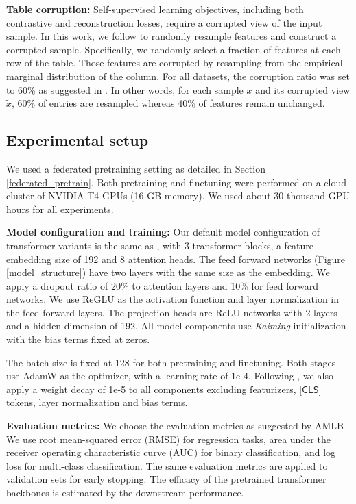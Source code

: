 \textbf{Table corruption:} Self-supervised learning objectives, including both contrastive and reconstruction losses, require a corrupted view of the input sample. In this work, we follow \citet{bahri2021scarf, rubachev2022revisiting} to randomly resample features and construct a corrupted sample. Specifically, we randomly select a fraction of features at each row of the table. Those features are corrupted by resampling from the empirical marginal distribution of the column. For all datasets, the corruption ratio was set to 60\% as suggested in \citet{bahri2021scarf}. In other words, for each sample $x$ and its corrupted view $\tilde{x}$, 60\% of entries are resampled whereas 40\% of features remain unchanged. 

\subsection{Experimental setup} We used a federated pretraining setting as detailed in Section \ref{federated_pretrain}. Both pretraining and finetuning were performed on a cloud cluster of NVIDIA T4 GPUs (16 GB memory). We used about 30 thousand GPU hours for all experiments.

\textbf{Model configuration and training:} Our default model configuration of transformer variants is the same as \citet{gorishniy2021revisiting}, with 3 transformer blocks, a feature embedding size of 192 and 8 attention heads. The feed forward networks (Figure \ref{model_structure}) have two layers with the same size as the embedding. We apply a dropout ratio of 20\% to attention layers and 10\% for feed forward networks. We use ReGLU \citep{shazeer2020glu} as the activation function and layer normalization \citep{ba2016layer} in the feed forward layers. The projection heads are ReLU networks with 2 layers and a hidden dimension of 192. All model components use \textit{Kaiming} initialization \citep{he2015delving} with the bias terms fixed at zeros. 

The batch size is fixed at 128 for both pretraining and finetuning. Both stages use AdamW as the optimizer, with a learning rate of 1e-4. Following \citet{gorishniy2021revisiting, rubachev2022revisiting}, we also apply a weight decay of 1e-5 to all components excluding featurizers, $\textsf{[CLS]}$ tokens, layer normalization and bias terms.

\textbf{Evaluation metrics:} We choose the evaluation metrics as suggested by AMLB \citep{gijsbers2022amlb}. We use  root mean-squared error (RMSE) for regression tasks, area under the receiver operating characteristic curve (AUC) for binary classification, and log loss for multi-class classification. The same evaluation metrics are applied to validation sets for early stopping. The efficacy of the pretrained transformer backbones is estimated by the downstream performance.

